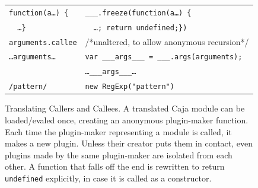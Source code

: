 \documentclass[letterpaper,twocolumn,10pt]{article}
\newcommand{\code}[1]{{\tt {#1}}}              %
\begin{document}
\begin{figure}
\begin{tabular}{ll}
  \code{function(a\ldots)\ \{}
                 & \code{\_\_\_.freeze(function(a\ldots)\ \{} \\
  \code{\ \ \ldots\}}          
                 & \code{\ \ \ldots; return undefined;\})} \\
  \hline
  \code{arguments.callee}   & /*unaltered, to allow anonymous recursion*/ \\
  \code{\ldots arguments\ldots} 
     &\code{var \_\_\_args\_\_\_ = \_\_\_.args(arguments);}\\
                 & \code{\ldots \_\_\_args\_\_\_\ldots} \\
  \hline
  \code{/pattern/} & \code{new RegExp("pattern")}
\end{tabular}

\caption[Translating Callers and Callees]{Translating Callers and Callees.
A translated Caja module can be loaded/evaled once, creating an anonymous
plugin-maker function. Each time the plugin-maker representing a module is
called, it makes a new plugin. Unless their creator puts them in contact, even
plugins made by the same plugin-maker are isolated from each other. A function
that falls off the end is rewritten to return \code{undefined} explicitly, in
case it is called as a constructor.}
\label{tab:call-xlate}
\end{figure}
\end{document}
